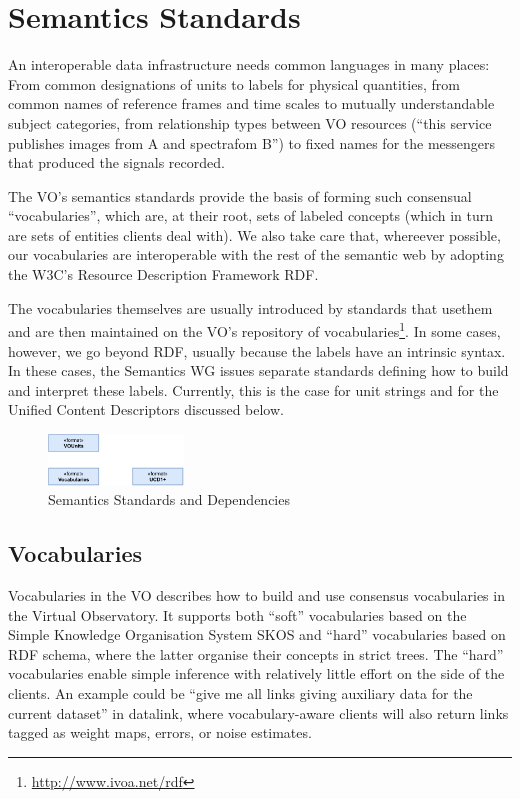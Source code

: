 \documentclass[11pt,letter]{ivoa}
\begin{document}
\section{Semantics Standards}

An interoperable data infrastructure needs common languages in many
places: From common designations of units to labels for physical
quantities, from common names of reference frames and time scales to
mutually understandable subject categories, from relationship types
between VO resources (``this service publishes images from A and spectrafom B'') to fixed names for the messengers that produced the signals
recorded.

The VO's semantics standards provide the basis of forming such
consensual ``vocabularies'', which are, at their root, sets of labeled
concepts (which in turn are sets of entities clients deal with).  We
also take care that, whereever possible, our vocabularies are
interoperable with the rest of the semantic web by adopting the W3C's
Resource Description Framework RDF.

The vocabularies themselves are usually introduced by standards that usethem and are then maintained on the VO's repository of
vocabularies\footnote{\url{http://www.ivoa.net/rdf}}.  In some cases,
however, we go beyond RDF, usually because the labels have an intrinsic
syntax.  In these cases, the Semantics WG issues separate standards
defining how to build and interpret these labels.  Currently, this is
the case for unit strings and for the Unified Content Descriptors
discussed below.

\begin{figure}[ht]
\centering
\includegraphics[width=0.32\textwidth]{ivoa-arch-semantics.pdf}
\caption{Semantics Standards and Dependencies}
\label{fig:semdeps}
\end{figure}

\subsection{Vocabularies}

Vocabularies in the VO \citep{2021ivoa.spec.0525D} describes how to
build and use
consensus vocabularies in the Virtual Observatory.  It supports both
``soft'' vocabularies based on the Simple Knowledge Organisation System
SKOS and ``hard'' vocabularies based on RDF schema, where the latter
organise their concepts in strict trees.  The ``hard'' vocabularies
enable simple inference with relatively little effort on the side of
the clients.  An example could be ``give me all links giving auxiliary
data for the current dataset'' in datalink, where vocabulary-aware
clients will also return links tagged as weight maps, errors, or noise
estimates.
\end{document}
